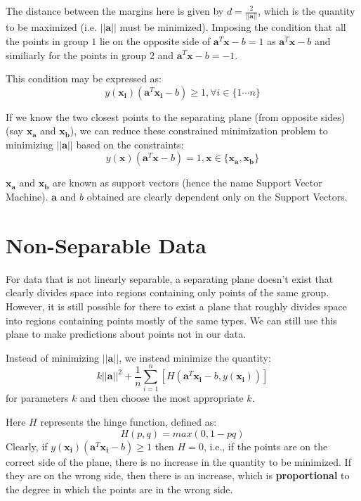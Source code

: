 \documentclass[12 pt]{report}
\begin{document}
    The distance between the margins here is given by $d = \frac{2}{||\bm{a}||}$, which is the quantity to be maximized (i.e. $||\bm{a}||$ must be minimized).
    Imposing the condition that all the points in group $1$ lie on the opposite side of $\bm{a}^{T}\bm{x} - b = 1$ as $\bm{a}^{T}\bm{x} - b$ and similiarly for 
    the points in group $2$ and $\bm{a}^{T}\bm{x} - b = -1$.

    This condition may be expressed as:
    \begin{equation}
        y(\bm{x_{i}})(\bm{a}^{T}\bm{x_{i}} - b) \geq 1, \forall i \in \{1 \cdots n\}
    \end{equation}

    If we know the two closest points to the separating plane (from opposite sides) (say $\bm{x_{a}}$ and $\bm{x_{b}}$), we can reduce these constrained minimization problem to 
    minimizing $||\bm{a}||$ based on the constraints:
    \begin{equation}
        y(\bm{x})(\bm{a}^{T}\bm{x} - b) = 1, \bm{x} \in \{\bm{x_{a}}, \bm{x_{b}}\}
    \end{equation}

    $\bm{x_{a}}$ and $\bm{x_{b}}$ are known as support vectors (hence the name Support Vector Machine). $\bm{a}$ and $b$ obtained are clearly dependent only 
    on the Support Vectors.

    \section{Non-Separable Data}
    For data that is not linearly separable, a separating plane doesn't exist that clearly divides space into regions containing only points of the same group.
    However, it is still possible for there to exist a plane that roughly divides space into regions containing points mostly of the same types. We can still 
    use this plane to make predictions about points not in our data.

    Instead of minimizing $||\bm{a}||$, we instead minimize the quantity:
    \begin{equation}
        k||\bm{a}||^{2} + \frac{1}{n}\sum_{i = 1}^{n}[H(\bm{a}^{T}\bm{x_{i}} - b, y(\bm{x_{i}}))]
    \end{equation}
    for parameters $k$ and then choose the most appropriate $k$.

    Here $H$ represents the hinge function, defined as:
    \begin{equation}
        H(p, q) = max(0, 1-pq)
    \end{equation}
    Clearly, if $y(\bm{x_{i}})(\bm{a}^{T}\bm{x_{i}} - b) \geq 1$ then $H = 0$, i.e., if the points are on the correct side of the plane, there is no increase in the quantity to be minimized.
    If they are on the wrong side, then there is an increase, which is \textbf{proportional} to the degree in which the points are in the wrong side.
\end{document}
